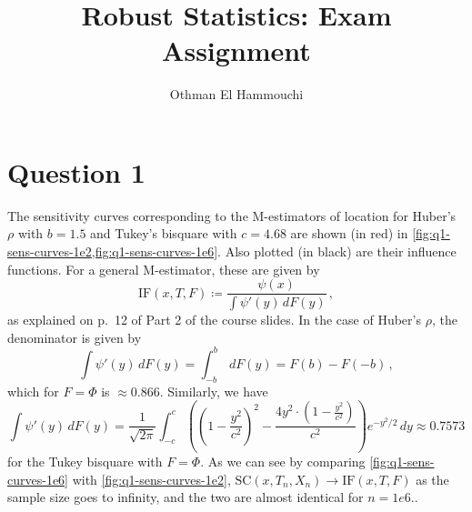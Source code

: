 \documentclass[titlepage]{article}
\title{Robust Statistics: Exam Assignment}
\author{Othman El Hammouchi}
\begin{document}
\maketitle

\section*{Question 1}

The sensitivity curves corresponding to the M-estimators of location for Huber's $\rho$ with $b = 1.5$ and Tukey's bisquare with $c = 4.68$ are shown (in red) in \cref{fig:q1-sens-curves-1e2,fig:q1-sens-curves-1e6}. Also plotted (in black) are their influence functions. For a general M-estimator, these are given by
\begin{equation}
  \mathrm{IF}(x, T, F) \coloneqq \frac{\psi(x)}{\int \psi'(y) \, dF(y)} \,,
\end{equation}
as explained on p.\ 12 of Part 2 of the course slides. In the case of Huber's $\rho$, the denominator is given by
\begin{equation}
  \int \psi'(y) \, dF(y) = \int_{-b}^b \, dF(y) = F(b) - F(-b) \,,
\end{equation}
which for $F = \Phi$ is $\approx 0.866$. Similarly, we have
\begin{equation}
  \int \psi'(y) \, dF(y) = \frac{1}{\sqrt{2 \pi}} \int_{-c}^c \left(\left(1 - \frac{y^{2}}{c^{2}}\right)^{2} - \frac{4 y^{2} \cdot \left(1 - \frac{y^{2}}{c^{2}}\right)}{c^{2}}\right) e^{- y^{2} / 2} \, dy \approx 0.7573
\end{equation}
for the Tukey bisquare with $F = \Phi$. As we can see by comparing \cref{fig:q1-sens-curves-1e6} with \cref{fig:q1-sens-curves-1e2}, $\mathrm{SC}(x, T_n, X_n) \to \mathrm{IF}(x, T, F)$ as the sample size goes to infinity, and the two are almost identical for $n = 1e6$..
\end{document}
